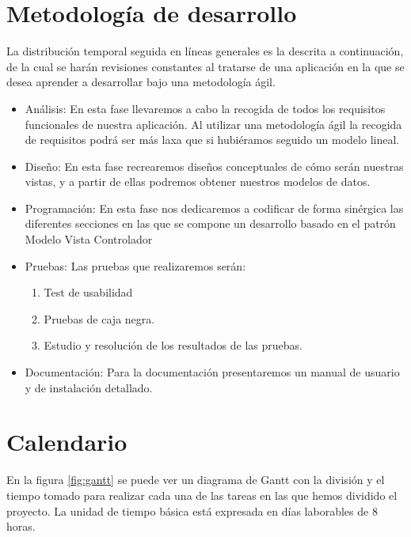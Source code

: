 

\section{Metodología de desarrollo}
La distribución temporal seguida en líneas generales es la descrita a
continuación, de la cual se harán revisiones constantes al tratarse de una
aplicación en la que se desea aprender a desarrollar bajo una metodología ágil.
\begin{itemize}
\item Análisis: En esta fase llevaremos a cabo la recogida de todos los
  requisitos funcionales de nuestra aplicación. Al utilizar una metodología ágil
  la recogida de requisitos podrá ser más laxa que si hubiéramos seguido un
  modelo lineal.
\item Diseño: En esta fase recrearemos diseños conceptuales de cómo serán
  nuestras vistas, y a partir de ellas podremos obtener nuestros modelos de
  datos.
\item Programación: En esta fase nos dedicaremos a codificar de forma sinérgica
  las diferentes secciones en las que se compone un desarrollo basado en el
  patrón Modelo Vista Controlador
\item Pruebas: Las pruebas que realizaremos serán:
  \begin{enumerate}
  \item Test de usabilidad
  \item Pruebas de caja negra.
  \item Estudio y resolución de los resultados de las pruebas.
  \end{enumerate}
\item Documentación: Para la documentación presentaremos un manual de usuario y
  de instalación detallado.
\end{itemize}

\section{Calendario}

En la figura \ref{fig:gantt} se puede ver un diagrama de Gantt con la división y
el tiempo tomado para realizar cada una de las tareas en las que hemos dividido
el proyecto. La unidad de tiempo básica está expresada en días laborables de 8
horas.

